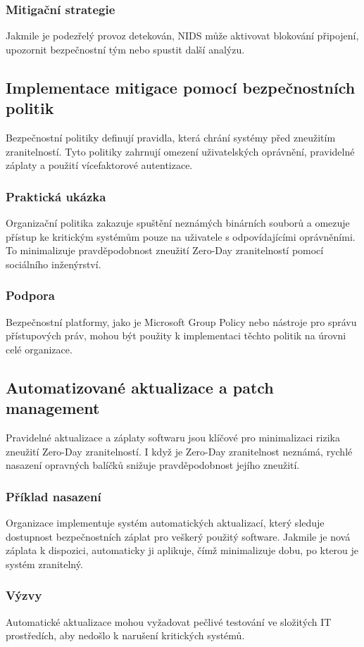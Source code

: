 \documentclass[11pt, conference, a4paper]{IEEEtran}
\begin{document}
\subsubsection{Mitigační strategie }Jakmile je podezřelý provoz detekován, NIDS může aktivovat blokování připojení, upozornit bezpečnostní tým nebo spustit další analýzu.
\subsection{Implementace mitigace pomocí bezpečnostních politik}
Bezpečnostní politiky definují pravidla, která chrání systémy před zneužitím zranitelností. Tyto politiky zahrnují omezení uživatelských oprávnění, pravidelné záplaty a použití vícefaktorové autentizace.

\subsubsection{Praktická ukázka} Organizační politika zakazuje spuštění neznámých binárních souborů a omezuje přístup ke kritickým systémům pouze na uživatele s odpovídajícími oprávněními. To minimalizuje pravděpodobnost zneužití Zero-Day zranitelností pomocí sociálního inženýrství.
\subsubsection{Podpora} Bezpečnostní platformy, jako je Microsoft Group Policy nebo nástroje pro správu přístupových práv, mohou být použity k implementaci těchto politik na úrovni celé organizace.
\subsection{Automatizované aktualizace a patch management \cite{Taylor}}
Pravidelné aktualizace a záplaty softwaru jsou klíčové pro minimalizaci rizika zneužití Zero-Day zranitelností. I když je Zero-Day zranitelnost neznámá, rychlé nasazení opravných balíčků snižuje pravděpodobnost jejího zneužití.

\subsubsection{Příklad nasazení} Organizace implementuje systém automatických aktualizací, který sleduje dostupnost bezpečnostních záplat pro veškerý použitý software. Jakmile je nová záplata k dispozici, automaticky ji aplikuje, čímž minimalizuje dobu, po kterou je systém zranitelný.
\subsubsection{Výzvy} Automatické aktualizace mohou vyžadovat pečlivé testování ve složitých IT prostředích, aby nedošlo k narušení kritických systémů.
\end{document}
